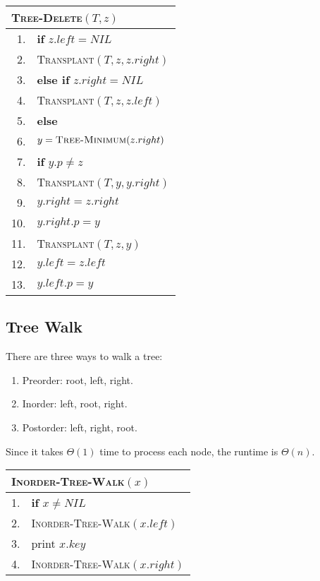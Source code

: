 \documentclass[a4paper,12pt]{article}
\begin{document}
\begin{center}
	\begin{tabular}{rl}
		\toprule
		\multicolumn{2}{l}{\textsc{Tree-Delete}$(T, z)$} \\
		\midrule
		1. & \textbf{if} $z.left = NIL$ \\
		2. & \quad \textsc{Transplant}$(T, z, z.right)$ \\
		3. & \textbf{else if} $z.right = NIL$ \\
		4. & \quad \textsc{Transplant}$(T, z, z.left)$ \\
		5. & \textbf{else} \\
		6. & \quad $y = \textsc{Tree-Minimum}(z.right)$ \\
		7. & \quad \textbf{if} $y.p \neq z$ \\
		8. & \quad \quad \textsc{Transplant}$(T, y, y.right)$ \\
		9. & \quad \quad $y.right = z.right$ \\
		10. & \quad \quad $y.right.p = y$ \\
		11. & \quad \textsc{Transplant}$(T, z, y)$ \\
		12. & \quad $y.left = z.left$ \\
		13. & \quad $y.left.p = y$ \\
		\bottomrule
	\end{tabular}
\end{center}

\subsection{Tree Walk}

There are three ways to walk a tree:
\begin{enumerate}
	\item Preorder: root, left, right.
	\item Inorder: left, root, right.
	\item Postorder: left, right, root.
\end{enumerate}

Since it takes $\Theta(1)$ time to process each node, the runtime is $\Theta(n)$.

\begin{center}
	\begin{tabular}{rl}
		\toprule
		\multicolumn{2}{l}{\textsc{Inorder-Tree-Walk}$(x)$} \\
		\midrule
		1. & \textbf{if} $x \neq NIL$ \\
		2. & \quad \textsc{Inorder-Tree-Walk}$(x.left)$ \\
		3. & \quad print $x.key$ \\
		4. & \quad \textsc{Inorder-Tree-Walk}$(x.right)$ \\
		\bottomrule
	\end{tabular}
\end{center}
\end{document}
